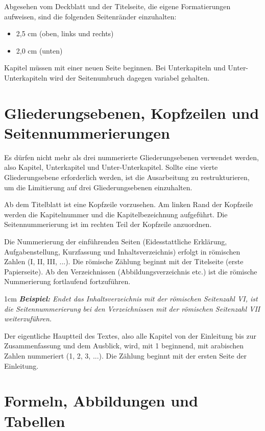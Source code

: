 Abgesehen vom Deckblatt und der Titelseite, die eigene Formatierungen aufweisen, sind die folgenden Seitenränder einzuhalten:

\begin{itemize}
\item 2,5 cm (oben, links und rechts)
\item 2,0 cm (unten)
\end{itemize}

Kapitel müssen mit einer neuen Seite beginnen. Bei Unterkapiteln und Unter-Unterkapiteln wird der Seitenumbruch dagegen variabel gehalten.

\section{Gliederungsebenen, Kopfzeilen und Seitennummerierungen}
\label{sec:nummerierung}

Es dürfen nicht mehr als drei nummerierte Gliederungsebenen verwendet werden, also Kapitel, Unterkapitel und Unter-Unterkapitel. Sollte eine vierte Gliederungsebene erforderlich werden, ist die Ausarbeitung zu restrukturieren, um die Limitierung auf drei Gliederungsebenen einzuhalten.

Ab dem Titelblatt ist eine Kopfzeile vorzusehen. Am linken Rand der Kopfzeile werden die Kapitelnummer und die Kapitelbezeichnung aufgeführt. Die Seitennummerierung ist im rechten Teil der Kopfzeile anzuordnen. 

Die Nummerierung der einführenden Seiten (Eidesstattliche Erklärung, Aufgabenstellung, Kurzfassung und Inhaltsverzeichnis) erfolgt in römischen Zahlen (I, II, III, ...). Die römische Zählung beginnt mit der Titelseite (erste Papierseite). Ab den Verzeichnissen (Abbildungsverzeichnis etc.) ist die römische Nummerierung fortlaufend fortzuführen. 

\begin{addmargin}[1cm]{1cm}
	\textit{\textbf{Beispiel:} Endet das Inhaltsverzeichnis mit der römischen Seitenzahl \textit{VI}, ist die Seitennummerierung bei den Verzeichnissen mit der römischen Seitenzahl \textit{VII} weiterzuführen.}
\end{addmargin}

Der eigentliche Hauptteil des Textes, also alle Kapitel von der Einleitung bis zur Zusammenfassung und dem Ausblick, wird, mit 1 beginnend, mit arabischen Zahlen nummeriert (1, 2, 3, ...). Die Zählung beginnt mit der ersten Seite der Einleitung.

\section{Formeln, Abbildungen und Tabellen}

